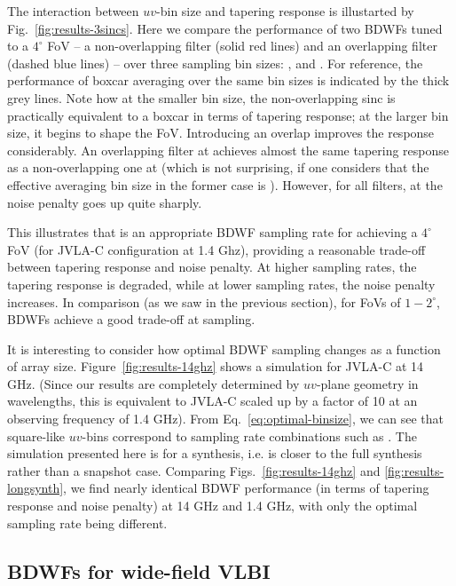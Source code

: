 \documentclass[useAMS,usenatbib]{mn2e}
\begin{document}
The interaction between $uv$-bin size and tapering response is illustarted by Fig.~\ref{fig:results-3sincs}. Here we
compare the performance of two BDWFs tuned to a $4^\circ$ FoV -- a non-overlapping  filter 
(solid red lines) and an overlapping  filter (dashed blue lines) -- over three sampling bin sizes: 
,  and . For reference, the performance of boxcar averaging over the same bin sizes
is indicated by the thick grey lines. Note how at the smaller bin size, the non-overlapping sinc is practically 
equivalent to a boxcar in terms of tapering response; at the larger bin size, it begins to shape the FoV. Introducing an 
overlap improves the response considerably. An overlapping filter at  achieves almost the same tapering
response as a non-overlapping one at  (which is not surprising, if one considers that the effective 
averaging bin size in the former case is ). However, for all filters, at  the noise penalty 
goes up quite sharply. 

This illustrates that  is an appropriate BDWF sampling rate for achieving a $4^\circ$ FoV (for JVLA-C configuration at 
1.4 Ghz), providing a reasonable trade-off between tapering response and noise penalty. At higher sampling rates, 
the tapering response is degraded, while at lower sampling rates, the noise penalty increases. In comparison (as we 
saw in the previous section), for FoVs of $1-2^\circ$, BDWFs achieve a good trade-off at  sampling.

It is interesting to consider how optimal BDWF sampling changes as a function of array size. Figure~\ref{fig:results-14ghz}
shows a simulation for JVLA-C at 14 GHz. (Since our results are completely determined by $uv$-plane geometry in 
wavelengths, this is equivalent to JVLA-C scaled up by a factor of 10 at an observing frequency of 1.4 GHz). 
From Eq.~\ref{eq:optimal-binsize}, we can see that square-like $uv$-bins correspond to 
sampling rate combinations such as . The simulation presented here is for a  synthesis,
i.e. is closer to the full synthesis rather than a snapshot case. Comparing Figs.~\ref{fig:results-14ghz} and 
\ref{fig:results-longsynth}, we find nearly identical BDWF performance (in terms of tapering response and
noise penalty) at 14 GHz and 1.4 GHz, with only the optimal sampling rate being different. 

\subsection{BDWFs for wide-field VLBI}
\end{document}
